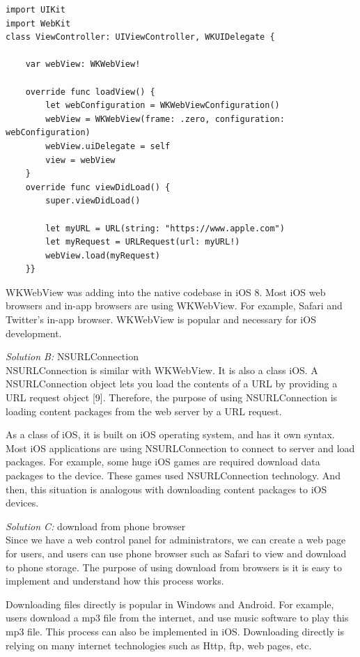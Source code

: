 \documentclass[letterpaper, 10pt,titlepage]{article}
\begin{document}
\begin{verbatim}
import UIKit
import WebKit
class ViewController: UIViewController, WKUIDelegate {
    
    var webView: WKWebView!
    
    override func loadView() {
        let webConfiguration = WKWebViewConfiguration()
        webView = WKWebView(frame: .zero, configuration: webConfiguration)
        webView.uiDelegate = self
        view = webView
    }
    override func viewDidLoad() {
        super.viewDidLoad()
        
        let myURL = URL(string: "https://www.apple.com")
        let myRequest = URLRequest(url: myURL!)
        webView.load(myRequest)
    }}
\end{verbatim}

WKWebView was adding into the native codebase in iOS 8. Most iOS web browsers and in-app browsers are using WKWebView. For example, Safari and Twitter’s in-app browser. WKWebView is popular and necessary for iOS development.


\textit{Solution B:} NSURLConnection \\
NSURLConnection is similar with WKWebView. It is also a class iOS. A NSURLConnection object lets you load the contents of a URL by providing a URL request object [9]. Therefore, the purpose of using NSURLConnection is loading content packages from the web server by a URL request. 


As a class of iOS, it is built on iOS operating system, and has it own syntax. Most iOS applications are using NSURLConnection to connect to server and load packages. For example, some huge iOS games are required download data packages to the device. These games used NSURLConnection technology. And then, this situation is analogous with downloading content packages to iOS devices. 


\textit{Solution C:} download from phone browser \\
Since we have a web control panel for administrators, we can create a web page for users, and users can use phone browser such as Safari to view and download to phone storage. The purpose of using download from browsers is it is easy to implement and understand how this process works.


Downloading files directly is popular in Windows and Android. For example, users download a mp3 file from the internet, and use music software to play this mp3 file. This process can also be implemented in iOS. Downloading directly is relying on many internet technologies such as Http, ftp, web pages, etc. 
\end{document}
